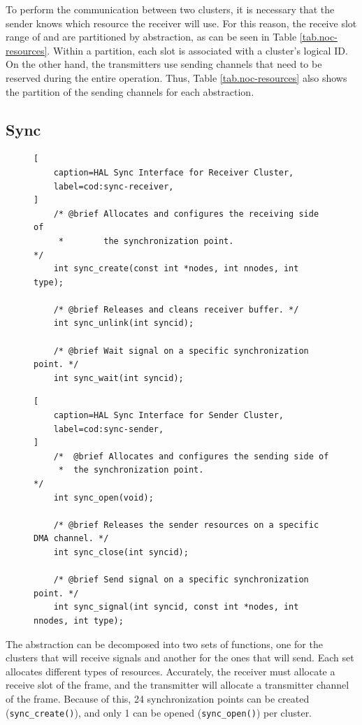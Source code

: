 	To perform the communication between two clusters, it is necessary that the
	sender knows which resource the receiver will use.
	For this reason, the receive slot range of \cnoc and \dnoc are partitioned
	by abstraction, as can be seen in Table \ref{tab.noc-resources}.
	Within a partition, each slot is associated with a cluster's logical ID.
	On the other hand, the transmitters use sending channels that need to
	be reserved during the entire operation.
	Thus, Table \ref{tab.noc-resources} also shows the partition of the
	sending channels for each abstraction.

	\subsection{Sync}

\begin{figure}[t]
\begin{lstlisting}[
	caption=HAL Sync Interface for Receiver Cluster,
	label=cod:sync-receiver,
]
	/* @brief Allocates and configures the receiving side of
	 *        the synchronization point.                     */
	int sync_create(const int *nodes, int nnodes, int type);

	/* @brief Releases and cleans receiver buffer. */
	int sync_unlink(int syncid);

	/* @brief Wait signal on a specific synchronization point. */
	int sync_wait(int syncid);
\end{lstlisting}
\end{figure}

\begin{figure}[t]
\begin{lstlisting}[
	caption=HAL Sync Interface for Sender Cluster,
	label=cod:sync-sender,
]
	/*  @brief Allocates and configures the sending side of
	 *  the synchronization point.                          */
	int sync_open(void);

	/* @brief Releases the sender resources on a specific DMA channel. */
	int sync_close(int syncid);

	/* @brief Send signal on a specific synchronization point. */
	int sync_signal(int syncid, const int *nodes, int nnodes, int type);
\end{lstlisting}
\end{figure}

		The \sync abstraction can be decomposed into two sets of functions,
		one for the clusters that will receive signals and another for the
		ones that will send.
		Each set allocates different types of resources.
		Accurately, the receiver must allocate a receive slot of the frame,
		and the transmitter will allocate a transmitter channel of the frame.
		Because of this, 24 synchronization points can be created (\texttt{sync\_create()}),
		and only 1 can be opened (\texttt{sync\_open()}) per cluster.

